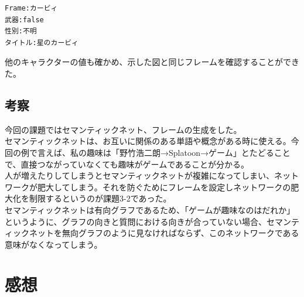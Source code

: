 \documentclass[a4j]{jarticle}
\begin{document}
\begin{screen}
\begin{verbatim}
Frame:カービィ
武器:false
性別:不明
タイトル:星のカービィ
\end{verbatim}
\end{screen}
他のキャラクターの値も確かめ、示した図と同じフレームを確認することができた。

\subsection{考察}
今回の課題ではセマンティックネット、フレームの生成をした。\\
セマンティックネットは、お互いに関係のある単語や概念がある時に使える。今回の例で言えば、私の趣味は「野竹浩二朗→Splatoon→ゲーム」とたどることで、直接つながっていなくても趣味がゲームであることが分かる。\\
人が増えたりしてしまうとセマンティックネットが複雑になってしまい、ネットワークが肥大してしまう。それを防ぐためにフレームを設定しネットワークの肥大化を制限するというのが課題3-2であった。\\
セマンティックネットは有向グラフであるため、「ゲームが趣味なのはだれか」というように、グラフの向きと質問における向きが合っていない場合、セマンティックネットを無向グラフのように見なければならず、このネットワークである意味がなくなってしまう。\\
\section{感想}
\end{document}
